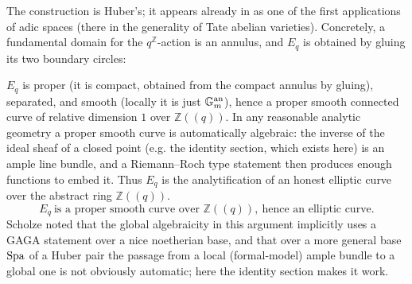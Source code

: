 The construction is Huber's; it appears already in \cite{Huber_1994} as one of
the first applications of adic spaces (there in the generality of Tate abelian
varieties). Concretely, a fundamental domain for the $q^{\mathbb{Z}}$-action is
an annulus, and $E_q$ is obtained by gluing its two boundary circles:

\begin{center}
\end{center}

\begin{remark}[$E_q$ is algebraic]
\label{rmk:12:algebraic}
$E_q$ is proper (it is compact, obtained from the compact annulus by gluing),
separated, and smooth (locally it is just $\mathbb{G}_{m}^{\mathrm{an}}$), hence a proper
smooth connected curve of relative dimension $1$ over $\mathbb{Z}(\!(q)\!)$. In
any reasonable analytic geometry a proper smooth curve is automatically
algebraic: the inverse of the ideal sheaf of a closed point (e.g. the identity
section, which exists here) is an ample line bundle, and a Riemann--Roch type
statement then produces enough functions to embed it. Thus $E_q$ is the
analytification of an honest elliptic curve over the abstract ring
$\mathbb{Z}(\!(q)\!)$.
\begin{equation*}
E_q\ \text{is a proper smooth curve over } \mathbb{Z}(\!(q)\!),\ \text{hence an elliptic curve.}
\end{equation*}
Scholze noted that the global algebraicity in this argument implicitly uses a
GAGA statement over a nice noetherian base, and that over a more general base
$\operatorname{Spa}$ of a Huber pair the passage from a local (formal-model) ample bundle to a
global one is not obviously automatic; here the identity section makes it work.
\end{remark}

